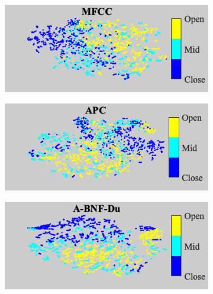 \documentclass[transmag]{IEEEtran}
\begin{document}
\begin{figure}[!t]
    \begin{subfigure}{0.495\linewidth}
	   \centering
	   \includegraphics[width=1\linewidth]{Rtsne_af_height_mfcc_disc_bar_adjust_journal.png}
    \end{subfigure}
   \begin{subfigure}{0.495\linewidth}
	   \centering
	   \includegraphics[width=1\linewidth]{Rtsne_af_height_apc_unlab_600_disc_bar_adjust_journal.png}
    \end{subfigure}
    \newline
   \begin{subfigure}{0.495\linewidth}
	   \centering
	   \includegraphics[width=1\linewidth]{Rtsne_af_height_bnf_cgn_apc_input_disc_bar_adjust_journal.png}
    \end{subfigure}    \begin{subfigure}{0.495\linewidth}

\end{subfigure}
\end{figure}
\end{document}
